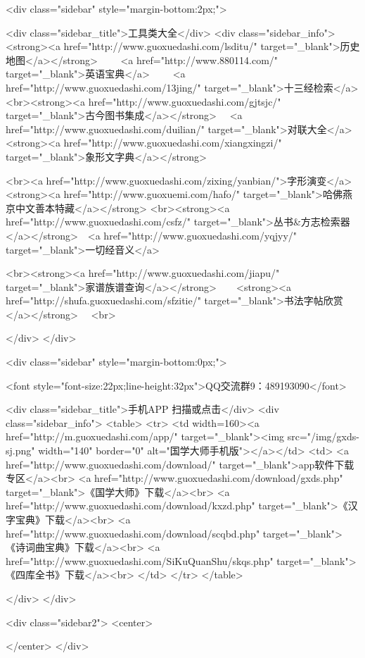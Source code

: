 <div class="sidebar"  style="margin-bottom:2px;">

 
<div class="sidebar_title">工具类大全</div>
<div class="sidebar_info">
<strong><a href="http://www.guoxuedashi.com/lsditu/" target="_blank">历史地图</a></strong>　　
<a href="http://www.880114.com/" target="_blank">英语宝典</a>　　
<a href="http://www.guoxuedashi.com/13jing/" target="_blank">十三经检索</a>　
<br><strong><a href="http://www.guoxuedashi.com/gjtsjc/" target="_blank">古今图书集成</a></strong>　
<a href="http://www.guoxuedashi.com/duilian/" target="_blank">对联大全</a>　<strong><a href="http://www.guoxuedashi.com/xiangxingzi/" target="_blank">象形文字典</a></strong>　

<br><a href="http://www.guoxuedashi.com/zixing/yanbian/">字形演变</a>　　<strong><a href="http://www.guoxuemi.com/hafo/" target="_blank">哈佛燕京中文善本特藏</a></strong>
<br><strong><a href="http://www.guoxuedashi.com/csfz/" target="_blank">丛书&方志检索器</a></strong>　<a href="http://www.guoxuedashi.com/yqjyy/" target="_blank">一切经音义</a>　　

<br><strong><a href="http://www.guoxuedashi.com/jiapu/" target="_blank">家谱族谱查询</a></strong>　　<strong><a href="http://shufa.guoxuedashi.com/sfzitie/" target="_blank">书法字帖欣赏</a></strong>　
<br>

</div>
</div>


<div class="sidebar" style="margin-bottom:0px;">

<font style="font-size:22px;line-height:32px">QQ交流群9：489193090</font>


<div class="sidebar_title">手机APP 扫描或点击</div>
<div class="sidebar_info">
<table>
<tr>
	<td width=160><a href="http://m.guoxuedashi.com/app/" target="_blank"><img src="/img/gxds-sj.png" width="140"  border="0" alt="国学大师手机版"></a></td>
	<td>
<a href="http://www.guoxuedashi.com/download/" target="_blank">app软件下载专区</a><br>
<a href="http://www.guoxuedashi.com/download/gxds.php" target="_blank">《国学大师》下载</a><br>
<a href="http://www.guoxuedashi.com/download/kxzd.php" target="_blank">《汉字宝典》下载</a><br>
<a href="http://www.guoxuedashi.com/download/scqbd.php" target="_blank">《诗词曲宝典》下载</a><br>
<a href="http://www.guoxuedashi.com/SiKuQuanShu/skqs.php" target="_blank">《四库全书》下载</a><br>
</td>
</tr>
</table>

</div>
</div>


<div class="sidebar2">
<center>


</center>
</div>

